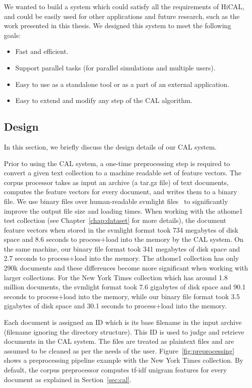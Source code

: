 We wanted to build a system which could satisfy all the requirements of
HiCAL, and could be easily used for other applications and future research, such as
the work presented in this thesis. We designed this system to meet the following
goals:

\begin{itemize}
\item Fast and efficient.
\item Support parallel tasks (for parallel simulations and multiple users).
\item Easy to use as a standalone tool or as a part of an external application.
\item Easy to extend and modify any step of the CAL algorithm.
\end{itemize}

\subsection{Design}
\label{sec:cal.design}
In this section, we briefly discuss the design details of our CAL system.

Prior to using the CAL system, a one-time preprocessing step is required to convert a
given text collection to a machine readable set of feature vectors. The corpus
processor takes as input an archive (a tar.gz file) of text documents, computes
the feature vectors for every document, and writes them to a binary file. We use
binary files over human-readable svmlight files~\cite{joachims1999svmlight} to
significantly improve the output file size and loading times. When working with
the athome1 test collection (see Chapter~\ref{chap:dataset} for more details),
the document feature vectors when stored in the svmlight format took 734
megabytes of disk space and 8.6 seconds to process+load into the memory by
the CAL system. On the same machine, our binary file format took 341 megabytes
of disk space and 2.7 seconds to process+load into the memory. The athome1
collection has only 290k documents and these differences become more significant
when working with larger collections. For the New York Times collection which
has around 1.8 million documents, the svmlight format took 7.6 gigabytes of disk
space and 90.1 seconds to process+load into the memory, while our binary file
format took 3.5 gigabytes of disk space and 30.1 seconds to process+load into the
memory.

Each document is assigned an ID which is its base
filename in the input archive (filename ignoring the directory structure). This
ID is used to judge and retrieve documents in the CAL system. The files are
treated as plaintext files and are assumed to be cleaned as per the needs of the
user.  Figure~\ref{fig:preprocessing} shows a preprocessing pipeline example
with the New York Times collection.  By default, the corpus preprocessor computes
tf-idf unigram features for every document as explained in Section~\ref{sec:cal}.

